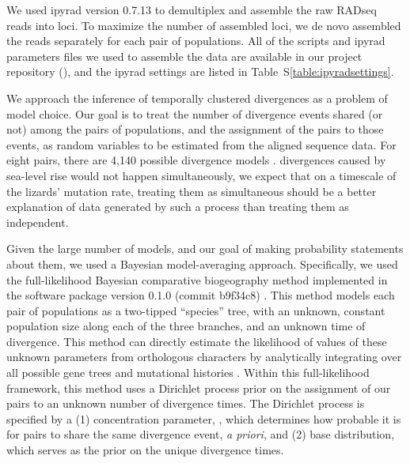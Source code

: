 We used ipyrad version 0.7.13 \citep{ipyrad0713} to demultiplex and assemble
the raw RADseq reads into loci.
To maximize the number of assembled loci, we de novo assembled the reads
separately for each pair of populations.
All of the scripts and ipyrad parameters files we used to assemble the data are
available in our project repository
(),
and the ipyrad settings are listed in
Table~S\ref{table:ipyradsettings}.

We approach the inference of temporally clustered divergences as a problem of
model choice.
Our goal is to treat the number of divergence events shared (or not) among the
pairs of populations, and the assignment of the pairs to those events, as
random variables to be estimated from the aligned sequence data.
For eight pairs, there are 4,140 possible divergence models
\citep[i.e., there are 4,140 ways to partition the eight pairs to $\nevents = 1, 2,
\ldots, 8$ divergence events;][]{Bell1934,Oaks2014dpp,Oaks2018ecoevolity}.
 divergences caused by sea-level rise would not happen simultaneously,
we expect that on a timescale of the lizards' mutation rate, treating them as
simultaneous should be a better explanation of data generated by such a
process than treating them as independent.

Given the large number of models, and our goal of making probability statements
about them, we used a Bayesian model-averaging approach.
Specifically, we used the full-likelihood Bayesian comparative biogeography
method implemented in the software package \ecoevolity version 0.1.0 (commit
b9f34c8) \citep{Oaks2018ecoevolity}.
This method models each pair of populations as a two-tipped ``species'' tree,
with an unknown, constant population size along each of the three branches, and
an unknown time of divergence.
This method can directly estimate the likelihood of values of these unknown
parameters from orthologous  characters by analytically integrating
over all possible gene trees and mutational histories \citep{Bryant2012,
    Oaks2018ecoevolity}.
Within this full-likelihood framework, this method uses a Dirichlet process
prior on the assignment of our pairs to an unknown number of divergence times.
The Dirichlet process is specified by a
(1) concentration parameter, \concentration, which determines how probable it
is for pairs to share the same divergence event, \emph{a priori}, and
(2) base distribution, which serves as the prior on the unique divergence
times.

